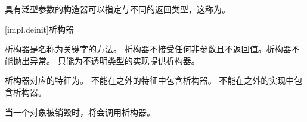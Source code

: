 \pnum
具有泛型参数的构造器可以指定与不同的返回类型，这称为。

[impl.deinit]{析构器}

\pnum
析构器是名称为关键字的方法。
析构器不接受任何非参数且不返回值。析构器不能抛出异常。
只能为不透明类型的实现提供析构器。

\pnum
析构器对应的特征为。
不能在之外的特征中包含析构器。
不能在之外的实现中包含析构器。

\pnum
当一个对象被销毁时，将会调用析构器。